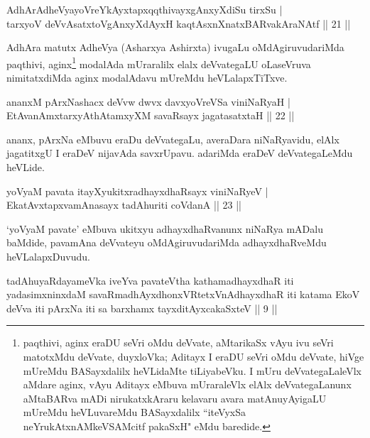 
\begin{shl}
AdhArAdheVyayoVreYkAyxtapxqqthivayxgAnxyXdiSu tirxSu |\\
tarxyoV deVvAsatxtoV\s gAnxyXdAyxH kaqtAsxnXnatxBARvakAraNAtf \hfill || 21 ||
\end{shl}

\begin{artha}
AdhAra matutx AdheVya (Asharxya Ashirxta) ivugaLu oMdAgiruvudariMda paqthivi, aginx\footnote[1]{paqthivi, aginx eraDU seVri oMdu deVvate, aMtarikaSx vAyu ivu seVri matotxMdu deVvate, duyxloVka; Aditayx I eraDU seVri oMdu deVvate, hiVge mUreMdu BASayxdalilx heVLidaMte tiLiyabeVku. I mUru deVvategaLaleVlx aMdare aginx, vAyu Aditayx eMbuva mUraraleVlx elAlx deVvategaLanunx aMtaBARva mADi nirukatxkAraru kelavaru avara matAnuyAyigaLU mUreMdu heVLuvareMdu BASayxdalilx ``iteVyxSa neYrukAtxnAMkeVSAMcitf pakaSxH" eMdu baredide.} modalAda mUraralilx elalx deVvategaLU oLaseVruva nimitatxdiMda aginx modalAdavu mUreMdu heVLalapxTiTxve.
\end{artha}


\begin{shl}
ananxM pArxNashacx deVvw dwvx davxyoVreVSa viniNaRyaH |\\
EtAvanAmxtarxyAthAtamxyXM savaRsayx jagatasatxtaH \hfill || 22 ||
\end{shl}

\begin{artha}
ananx, pArxNa eMbuvu eraDu deVvategaLu, averaDara niNaRyavidu, elAlx jagatitxgU I eraDeV nijavAda savxrUpavu. adariMda eraDeV deVvategaLeMdu heVLide.
\end{artha}

\begin{shl}
yoV\s yaM pavata itayXyukitxradhayxdhaRsayx viniNaRyeV |\\
EkatAvxtapxvamAnasayx tadAhuriti coVdanA \hfill || 23 ||
\end{shl}

\begin{artha}%
`yoV\s yaM pavate' eMbuva ukitxyu adhayxdhaRvanunx niNaRya mADalu baMdide, pavamAna deVvateyu oMdAgiruvudariMda adhayxdhaRveMdu heVLalapxDu\-vudu.
\end{artha}

\begin{shl}
tadAhuyaRdayameVka iveYva pavateV\s tha kathamadhayxdhaR iti yadasimxninxdaM savaRmadhAyxdhonxVRtetxVnAdhayxdhaR iti katama EkoV deVva iti pArxNa iti sa barxhamx tayxditAyxcakaSxteV || 9 ||
\end{shl}

